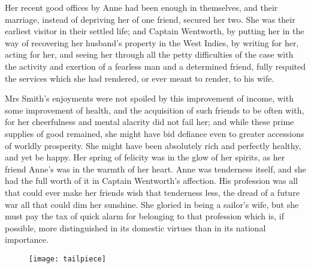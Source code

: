 Her recent good offices by Anne had been enough in themselves, and their marriage, instead of depriving her of one friend, secured her two. She was their earliest visitor in their settled life; and Captain Wentworth, by putting her in the way of recovering her husband's property in the West Indies, by writing for her, acting for her, and seeing her through all the petty difficulties of the case with the activity and exertion of a fearless man and a determined friend, fully requited the services which she had rendered, or ever meant to render, to his wife.

Mrs Smith's enjoyments were not spoiled by this improvement of income, with some improvement of health, and the acquisition of such friends to be often with, for her cheerfulness and mental alacrity did not fail her; and while these prime supplies of good remained, she might have bid defiance even to greater accessions of worldly prosperity. She might have been absolutely rich and perfectly healthy, and yet be happy. Her spring of felicity was in the glow of her spirits, as her friend Anne's was in the warmth of her heart. Anne was tenderness itself, and she had the full worth of it in Captain Wentworth's affection. His profession was all that could ever make her friends wish that tenderness less, the dread of a future war all that could dim her sunshine. She gloried in being a sailor's wife, but she must pay the tax of quick alarm for belonging to that profession which is, if possible, more distinguished in its domestic virtues than in its national importance.

\begin{figure}[b!]
\centering
\texttt{[image: tailpiece]}
\end{figure}